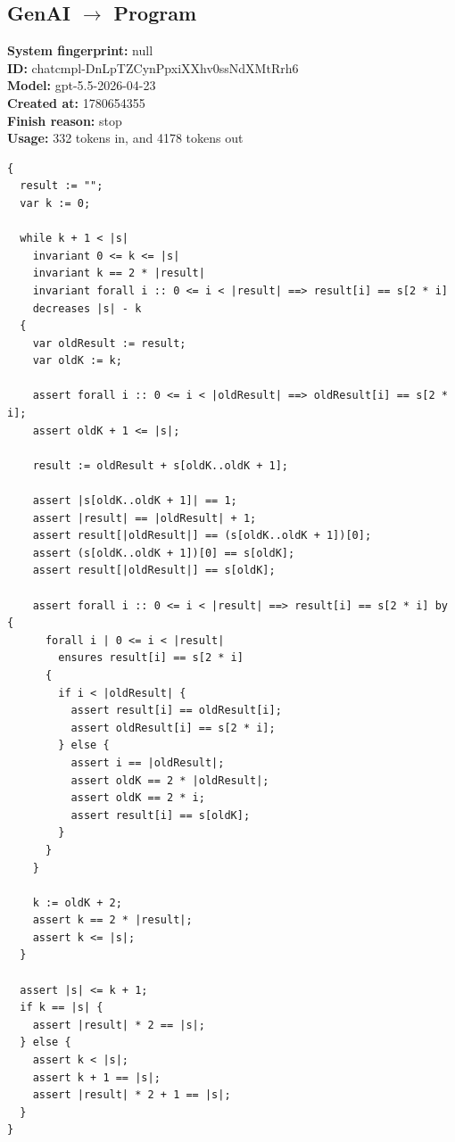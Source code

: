 \documentclass{article}
\begin{document}
\subsection*{GenAI $\rightarrow$ Program}
\textbf{System fingerprint: }null
\\\textbf{ID: }chatcmpl-DnLpTZCynPpxiXXhv0ssNdXMtRrh6
\\\textbf{Model: }gpt-5.5-2026-04-23
\\\textbf{Created at: }1780654355
\\\textbf{Finish reason: }stop
\\\textbf{Usage: }332 tokens in, and 4178 tokens out
\begin{lstlisting}
{
  result := "";
  var k := 0;

  while k + 1 < |s|
    invariant 0 <= k <= |s|
    invariant k == 2 * |result|
    invariant forall i :: 0 <= i < |result| ==> result[i] == s[2 * i]
    decreases |s| - k
  {
    var oldResult := result;
    var oldK := k;

    assert forall i :: 0 <= i < |oldResult| ==> oldResult[i] == s[2 * i];
    assert oldK + 1 <= |s|;

    result := oldResult + s[oldK..oldK + 1];

    assert |s[oldK..oldK + 1]| == 1;
    assert |result| == |oldResult| + 1;
    assert result[|oldResult|] == (s[oldK..oldK + 1])[0];
    assert (s[oldK..oldK + 1])[0] == s[oldK];
    assert result[|oldResult|] == s[oldK];

    assert forall i :: 0 <= i < |result| ==> result[i] == s[2 * i] by {
      forall i | 0 <= i < |result|
        ensures result[i] == s[2 * i]
      {
        if i < |oldResult| {
          assert result[i] == oldResult[i];
          assert oldResult[i] == s[2 * i];
        } else {
          assert i == |oldResult|;
          assert oldK == 2 * |oldResult|;
          assert oldK == 2 * i;
          assert result[i] == s[oldK];
        }
      }
    }

    k := oldK + 2;
    assert k == 2 * |result|;
    assert k <= |s|;
  }

  assert |s| <= k + 1;
  if k == |s| {
    assert |result| * 2 == |s|;
  } else {
    assert k < |s|;
    assert k + 1 == |s|;
    assert |result| * 2 + 1 == |s|;
  }
}
\end{lstlisting}
\end{document}

